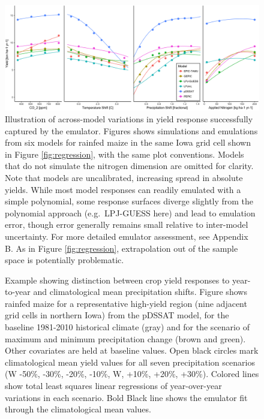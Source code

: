 \begin{figure}[ht]
\centering
    \includegraphics[width=16cm]{figures/regression_model.png}
    \caption{Illustration of across-model variations in yield response successfully captured by the emulator. 
    Figures shows simulations and emulations from six models for rainfed maize in the same Iowa grid cell shown in Figure \ref{fig:regression}, with the same plot conventions. 
    Models that do not simulate the nitrogen dimension are omitted for clarity. 
    Note that models are uncalibrated, increasing spread in absolute yields. 
    While most model responses can readily emulated with a simple polynomial, some response surfaces diverge slightly from the polynomial approach (e.g.\ LPJ-GUESS here) and lead to emulation error, though error generally remains small relative to inter-model uncertainty. 
    For more detailed emulator assessment, see Appendix B. 
    As in Figure \ref{fig:regression}, extrapolation out of the sample space is potentially problematic.}
   \label{fig:regression_iowa}
\end{figure}

\begin{figure}[ht]
\centering
   \caption{Example showing distinction between crop yield responses to year-to-year and climatological mean precipitation shifts. 
   Figure shows rainfed maize for a representative high-yield region (nine adjacent grid cells in northern Iowa) from the pDSSAT model, for the baseline 1981-2010 historical climate (gray) and for the scenario of maximum and minimum precipitation change (brown and green). 
   Other covariates are held at baseline values.
   Open black circles mark climatological mean yield values for all seven precipitation scenarios (W -50\%, -30\%, -20\%, -10\%, W, +10\%, +20\%, +30\%). 
   Colored lines show total least squares linear regressions of year-over-year variations in each scenario. 
   Bold Black line shows the emulator fit through the climatological mean values.}
   \label{fig:yearvclimpr}
\end{figure}

